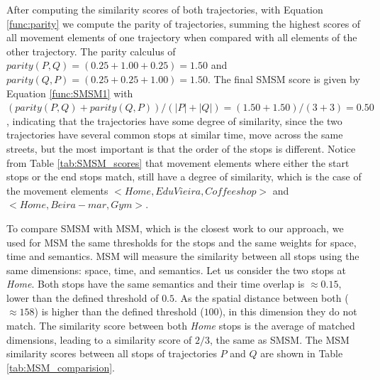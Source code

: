 After  computing the similarity scores of both trajectories, with Equation \ref{func:parity} we compute the parity of trajectories, summing the highest scores of all movement elements of one trajectory when compared with all elements of the other trajectory. The parity calculus of $parity(P, Q) = (0.25 + 1.00 + 0.25) = 1.50$ and $parity(Q, P) = (0.25 + 0.25 + 1.00) = 1.50$.
The final SMSM score is given by Equation \ref{func:SMSM1} with $(parity(P, Q) + parity(Q, P)) / (|P| + |Q|) = (1.50 + 1.50) / (3 + 3) = 0.50$, indicating that the trajectories have some degree of similarity, since the two trajectories have several common stops at similar time, move across the same streets, but the most important is that the order of the stops is different. Notice from Table \ref{tab:SMSM_scores} that movement elements where either the start stops or the end stops match, still have a degree of similarity, which is the case of the movement elements $<Home, Edu Vieira, Coffee shop>$ and $<Home, Beira-mar, Gym>$.

{To compare SMSM with MSM, which is the closest work to our approach, we used for MSM the same thresholds for the stops and the same weights for space, time and semantics.}
MSM will measure the similarity between all stops using the same dimensions: space, time, and semantics. Let us consider the two stops at \textit{Home}. Both stops have the same semantics and their time overlap is $\approx 0.15$, lower than the defined threshold of $0.5$. As the spatial distance between both ($\approx 158$) is higher than the defined threshold ($100$), in this dimension they do not match. The similarity score between both \textit{Home} stops is the average of matched dimensions, leading to a similarity score of $2/3$, the same as SMSM. The MSM similarity scores between all stops of trajectories $P$ and $Q$ are shown in Table \ref{tab:MSM_comparision}.

